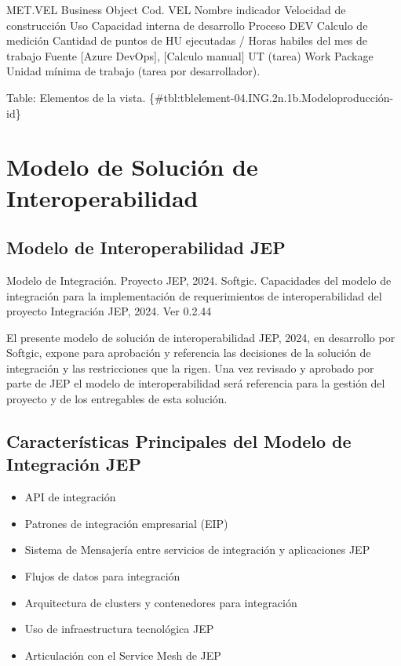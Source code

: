 \documentclass[
  paper=a4,
  ,captions=tableheading
]{scrartcl}
\providecommand{\tightlist}{%
  \setlength{\itemsep}{0pt}\setlength{\parskip}{0pt}}
\renewenvironment{quote}{\begin{customblockquote}\list{}{\rightmargin=0em\leftmargin=0em}%
\item\relax\color{blockquote-text}\ignorespaces}{\unskip\unskip\endlist\end{customblockquote}}
\begin{document}
\textbar{} \textbar{} MET.VEL \textbar{} Business Object \textbar{} Cod.
VEL Nombre indicador Velocidad de construcción Uso Capacidad interna de
desarrollo Proceso DEV Calculo de medición Cantidad de puntos de HU
ejecutadas / Horas habiles del mes de trabajo Fuente {[}Azure DevOps{]},
{[}Calculo manual{]} \textbar{} \textbar{} UT (tarea) \textbar{} Work
Package \textbar{} Unidad mínima de trabajo (tarea por desarrollador).
\textbar{}

Table: Elementos de la vista.
\{\#tbl:tblelement-04.ING.2n.1b.Modeloproducción-id\}

\newpage

\section{Modelo de Solución de
Interoperabilidad}\label{sec:modelo-de-soluciuxf3n-de-interoperabilidad}

\subsection{Modelo de Interoperabilidad
JEP}\label{sec:modelo-de-interoperabilidad-jep}

\begin{quote}
Modelo de Integración. Proyecto JEP, 2024. Softgic. Capacidades del
modelo de integración para la implementación de requerimientos de
interoperabilidad del proyecto Integración JEP, 2024. Ver 0.2.44
\end{quote}

El presente modelo de solución de interoperabilidad JEP, 2024, en
desarrollo por Softgic, expone para aprobación y referencia las
decisiones de la solución de integración y las restricciones que la
rigen. Una vez revisado y aprobado por parte de JEP el modelo de
interoperabilidad será referencia para la gestión del proyecto y de los
entregables de esta solución.

\subsection{Características Principales del Modelo de Integración
JEP}\label{sec:caracteruxedsticas-principales-del-modelo-de-integraciuxf3n-jep}

\begin{itemize}
\tightlist
\item
  API de integración
\item
  Patrones de integración empresarial (EIP)
\item
  Sistema de Mensajería entre servicios de integración y aplicaciones
  JEP
\item
  Flujos de datos para integración
\item
  Arquitectura de clusters y contenedores para integración
\item
  Uso de infraestructura tecnológica JEP
\item
  Articulación con el Service Mesh de JEP
\end{itemize}
\end{document}
